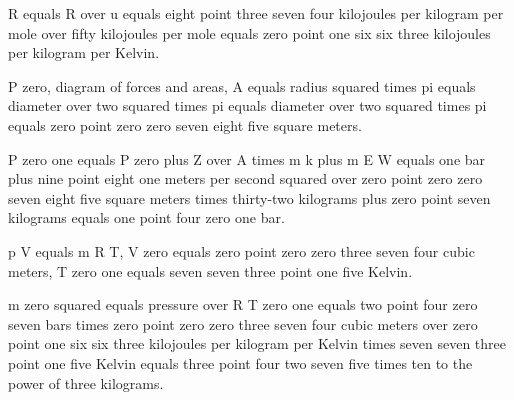 R equals R over u equals eight point three seven four kilojoules per kilogram per mole over fifty kilojoules per mole equals zero point one six six three kilojoules per kilogram per Kelvin.

P zero, diagram of forces and areas, A equals radius squared times pi equals diameter over two squared times pi equals diameter over two squared times pi equals zero point zero zero seven eight five square meters.

P zero one equals P zero plus Z over A times m k plus m E W equals one bar plus nine point eight one meters per second squared over zero point zero zero seven eight five square meters times thirty-two kilograms plus zero point seven kilograms equals one point four zero one bar.

p V equals m R T, V zero equals zero point zero zero three seven four cubic meters, T zero one equals seven seven three point one five Kelvin.

m zero squared equals pressure over R T zero one equals two point four zero seven bars times zero point zero zero three seven four cubic meters over zero point one six six three kilojoules per kilogram per Kelvin times seven seven three point one five Kelvin equals three point four two seven five times ten to the power of three kilograms.